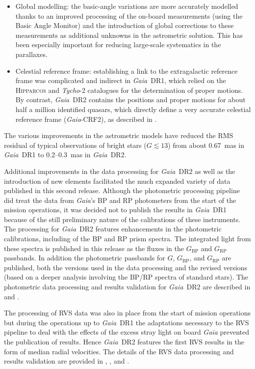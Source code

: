 \documentclass[longauth]{aa_gaia} %
\newcommand\gaia{\textit{Gaia}}
\newcommand\gdr[1]{\gaia~DR#1}
\newcommand\hip{\textsc{Hipparcos}}
\newcommand\tyctwo{\textit{Tycho}-2}
\newcommand\gaiacrftwo{\gaia-CRF2}
\newcommand\gbp{\ensuremath{G_\mathrm{BP}}}
\newcommand\grp{\ensuremath{G_\mathrm{RP}}}
\begin{document}
\begin{itemize}
  \item Global modelling: the basic-angle variations are more accurately modelled thanks to an
    improved processing of the on-board measurements (using the Basic Angle Monitor) and the
    introduction of global corrections to these measurements as additional unknowns in the
    astrometric solution. This has been especially important for reducing large-scale systematics in
    the parallaxes.
  \item Celestial reference frame: establishing a link to the extragalactic reference frame was
    complicated and indirect in \gdr{1}, which relied on the {\hip} and {\tyctwo}
    catalogues for the determination of proper motions. By contrast, \gdr{2} contains the positions
    and proper motions for about half a million identified quasars, which directly define a very
    accurate celestial reference frame (\gaiacrftwo), as described in \cite{DR2-DPACP-30}.
\end{itemize}
The various improvements in the astrometric models have reduced the RMS residual of typical
observations of bright stars ($G\lesssim 13$) from about 0.67~mas in \gdr{1} to 0.2--0.3~mas in
\gdr{2}.

Additional improvements in the data processing for \gdr{2} as well as the introduction of new
elements facilitated the much expanded variety of data published in this second release. Although
the photometric processing pipeline did treat the data from {\gaia}'s BP and RP photometers from the
start of the mission operations, it was decided not to publish the results in \gdr{1}
\citep{2017A&A...600A..51E} because of the still preliminary nature of the calibrations of these
instruments. The processing for \gdr{2} features enhancements in the photometric calibrations,
including of the BP and RP prism spectra. The integrated light from these spectra is published in
this release as the fluxes in the {\gbp} and {\grp} passbands. In addition the photometric passbands
for $G$, {\gbp}, and {\grp} are published, both the versions used in the data processing and the
revised versions (based on a deeper analysis involving the BP/RP spectra of standard stars). The
photometric data processing and results validation for \gdr{2} are described in
\cite{DR2-DPACP-40} and \cite{DR2-DPACP-44}. 

The processing of RVS data was also in place from the start of mission operations but during the
operations up to \gdr{1} the adaptations necessary to the RVS pipeline to deal with the effects of
the excess stray light on board {\gaia} prevented the publication of results. Hence \gdr{2}
features the first RVS results in the form of median radial velocities. The details of the RVS data
processing and results validation are provided in \cite{DR2-DPACP-47}, \cite{DR2-DPACP-54}, and
\cite{DR2-DPACP-48}. 
\end{document}
